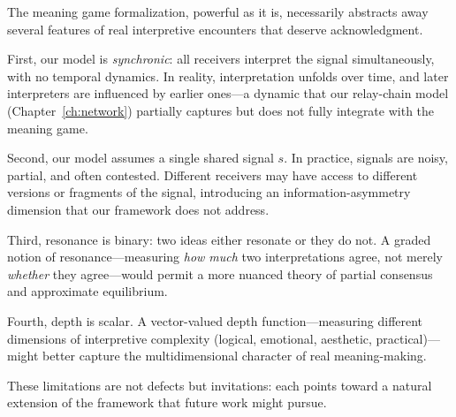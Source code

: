 \begin{remark}
\label{rem:limitations}
The meaning game formalization, powerful as it is, necessarily abstracts
away several features of real interpretive encounters that deserve
acknowledgment.

First, our model is \emph{synchronic}: all receivers interpret the signal
simultaneously, with no temporal dynamics.  In reality, interpretation
unfolds over time, and later interpreters are influenced by earlier ones---a
dynamic that our relay-chain model (Chapter~\ref{ch:network}) partially
captures but does not fully integrate with the meaning game.

Second, our model assumes a single shared signal $s$.  In practice,
signals are noisy, partial, and often contested.  Different receivers may
have access to different versions or fragments of the signal, introducing
an information-asymmetry dimension that our framework does not address.

Third, resonance is binary: two ideas either resonate or they do not.
A graded notion of resonance---measuring \emph{how much} two
interpretations agree, not merely \emph{whether} they agree---would
permit a more nuanced theory of partial consensus and approximate
equilibrium.

Fourth, depth is scalar.  A vector-valued depth function---measuring
different dimensions of interpretive complexity (logical, emotional,
aesthetic, practical)---might better capture the multidimensional character
of real meaning-making.

These limitations are not defects but invitations: each points toward a
natural extension of the framework that future work might pursue.
\end{remark}

